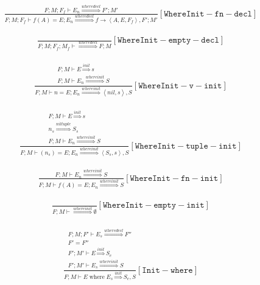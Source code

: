 \documentclass{scrartcl}
\DeclareMathOperator{\where}{where}
\begin{document}
    \begin{align*}
    \frac{
        F; M; F_f \vdash E_n \overset{wheredecl}{\Rightarrow} F'; M'
    }{
        F; M; F_f \vdash f(A) = E; E_n \overset{wheredecl}{\Rightarrow} f \to \left<A, E, F_f \right>, F'; M'
    }[\mathtt{WhereInit-fn-decl}]
    \end{align*}
    
    \begin{align*}
    \frac{}{
        F; M; F_f; M_f \vdash \overset{wheredecl}{\Rightarrow} F; M
    }[\mathtt{WhereInit-empty-decl}]
    \end{align*}
    
    \begin{align*}
    \frac{
        \begin{matrix}
        F; M \vdash E \overset{init}{\Rightarrow} s \\
        F; M \vdash E_n \overset{whereinit}{\Rightarrow} S
        \end{matrix}
    }{
        F; M \vdash n = E; E_n \overset{whereinit}{\Rightarrow} \left<nil, s\right>, S
    }[\mathtt{WhereInit-v-init}]
    \end{align*}
    
    \begin{align*}
    \frac{
        \begin{matrix}
        F; M \vdash E \overset{init}{\Rightarrow} s \\
        n_s \overset{niltuple}{\Rightarrow} S_s \\
        F; M \vdash E_n \overset{whereinit}{\Rightarrow} S
        \end{matrix}
    }{
        F; M \vdash ( n_s ) = E; E_n \overset{whereinit}{\Rightarrow} \left<S_s, s\right>, S
    }[\mathtt{WhereInit-tuple-init}]
    \end{align*}
    
    \begin{align*}
    \frac{
        F; M \vdash E_n \overset{whereinit}{\Rightarrow} S
    }{
        F; M \vdash f(A) = E; E_n \overset{whereinit}{\Rightarrow} S
    }[\mathtt{WhereInit-fn-init}]
    \end{align*}
    
    \begin{align*}
    \frac{}{
        F; M \vdash \overset{whereinit}{\Rightarrow} \emptyset
    }[\mathtt{WhereInit-empty-init}]
    \end{align*}
    
    \begin{align*}
    \frac{
        \begin{matrix}
        F; M; F' \vdash E_s \overset{wheredecl}{\Rightarrow} F'' \\
        F' = F'' \\
        F'; M' \vdash E \overset{init}{\Rightarrow} S_e \\
        F'; M' \vdash E_s \overset{whereinit}{\Rightarrow} S
        \end{matrix}
    }{
        F; M \vdash E \where E_s \overset{init}{\Rightarrow} S_e, S
    }[\mathtt{Init-where}]
    \end{align*}
    
\end{document}
